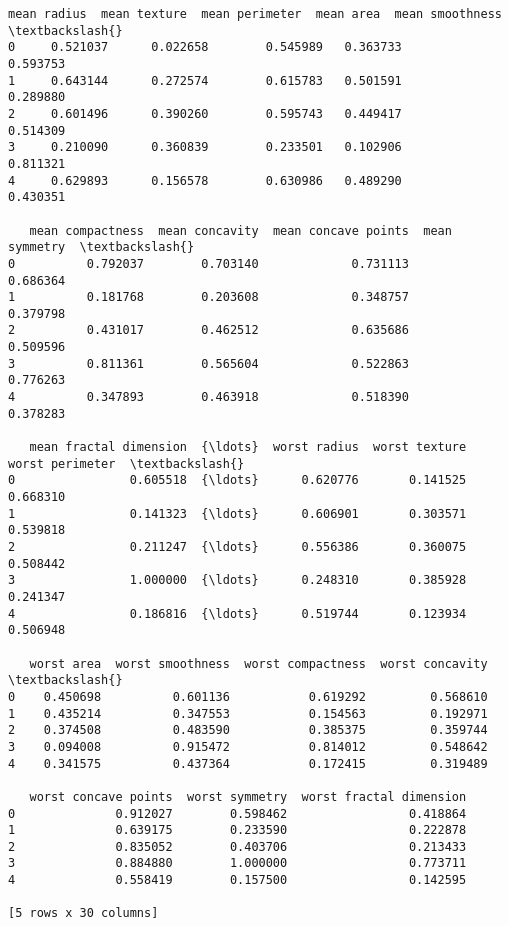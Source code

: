 \documentclass[11pt]{article}
\makeatletter
\newcommand{\boxspacing}{\kern\kvtcb@left@rule\kern\kvtcb@boxsep}
\newcommand{\prompt}[4]{
        {\ttfamily\llap{{\color{#2}[#3]:\hspace{3pt}#4}}\vspace{-\baselineskip}}
    }
\makeatother
\begin{document}
            \begin{tcolorbox}[breakable, size=fbox, boxrule=.5pt, pad at break*=1mm, opacityfill=0]
\prompt{Out}{outcolor}{2}{\boxspacing}
\begin{Verbatim}[commandchars=\\\{\}]
   mean radius  mean texture  mean perimeter  mean area  mean smoothness  \textbackslash{}
0     0.521037      0.022658        0.545989   0.363733         0.593753
1     0.643144      0.272574        0.615783   0.501591         0.289880
2     0.601496      0.390260        0.595743   0.449417         0.514309
3     0.210090      0.360839        0.233501   0.102906         0.811321
4     0.629893      0.156578        0.630986   0.489290         0.430351

   mean compactness  mean concavity  mean concave points  mean symmetry  \textbackslash{}
0          0.792037        0.703140             0.731113       0.686364
1          0.181768        0.203608             0.348757       0.379798
2          0.431017        0.462512             0.635686       0.509596
3          0.811361        0.565604             0.522863       0.776263
4          0.347893        0.463918             0.518390       0.378283

   mean fractal dimension  {\ldots}  worst radius  worst texture  worst perimeter  \textbackslash{}
0                0.605518  {\ldots}      0.620776       0.141525         0.668310
1                0.141323  {\ldots}      0.606901       0.303571         0.539818
2                0.211247  {\ldots}      0.556386       0.360075         0.508442
3                1.000000  {\ldots}      0.248310       0.385928         0.241347
4                0.186816  {\ldots}      0.519744       0.123934         0.506948

   worst area  worst smoothness  worst compactness  worst concavity  \textbackslash{}
0    0.450698          0.601136           0.619292         0.568610
1    0.435214          0.347553           0.154563         0.192971
2    0.374508          0.483590           0.385375         0.359744
3    0.094008          0.915472           0.814012         0.548642
4    0.341575          0.437364           0.172415         0.319489

   worst concave points  worst symmetry  worst fractal dimension
0              0.912027        0.598462                 0.418864
1              0.639175        0.233590                 0.222878
2              0.835052        0.403706                 0.213433
3              0.884880        1.000000                 0.773711
4              0.558419        0.157500                 0.142595

[5 rows x 30 columns]
\end{Verbatim}
\end{tcolorbox}
        
\end{document}
